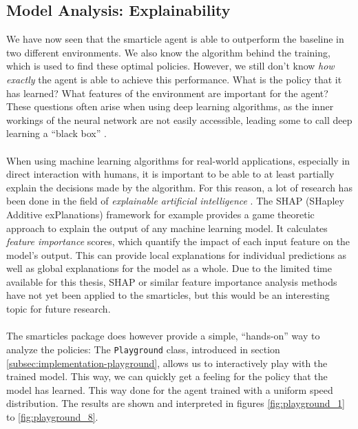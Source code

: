 \subsection{Model Analysis: Explainability}
\label{sec:model_analysis}
We have now seen that the smarticle agent is able to outperform the baseline in two different environments. We also know the algorithm behind the training, which is used to find these optimal policies. However, we still don't know \textit{how exactly} the agent is able to achieve this performance. What is the policy that it has learned? What features of the environment are important for the agent? These questions often arise when using deep learning algorithms, as the inner workings of the neural network are not easily accessible, leading some to call deep learning a \enquote{black box} \cite{blazek_blackbox_2022}.
\\
\\
When using machine learning algorithms for real-world applications, especially in direct interaction with humans, it is important to be able to at least partially explain the decisions made by the algorithm. For this reason, a lot of research has been done in the field of \textit{explainable artificial intelligence} \cite{explainable_ai_systematic_2023}. The SHAP (SHapley Additive exPlanations) framework \cite{lundberg_unified_2017, github_shapshap_2024} for example provides a game theoretic approach to explain the output of any machine learning model. It calculates \textit{feature importance} scores, which quantify the impact of each input feature on the model's output. This can provide local explanations for individual predictions as well as global explanations for the model as a whole. Due to the limited time available for this thesis, SHAP or similar feature importance analysis methods have not yet been applied to the smarticles, but this would be an interesting topic for future research.
\\
\\
The smarticles package does however provide a simple, \enquote{hands-on} way to analyze the policies: The \texttt{Playground} class, introduced in section \ref{subsec:implementation-playground}, allows us to interactively play with the trained model. This way, we can quickly get a feeling for the policy that the model has learned. This way done for the agent trained with a uniform speed distribution. The results are shown and interpreted in figures \ref{fig:playground_1} to \ref{fig:playground_8}. 

\newcommand\newsubcap[1]{\phantomcaption%
       \caption*{\thefigure\thesubfigure: #1}}

